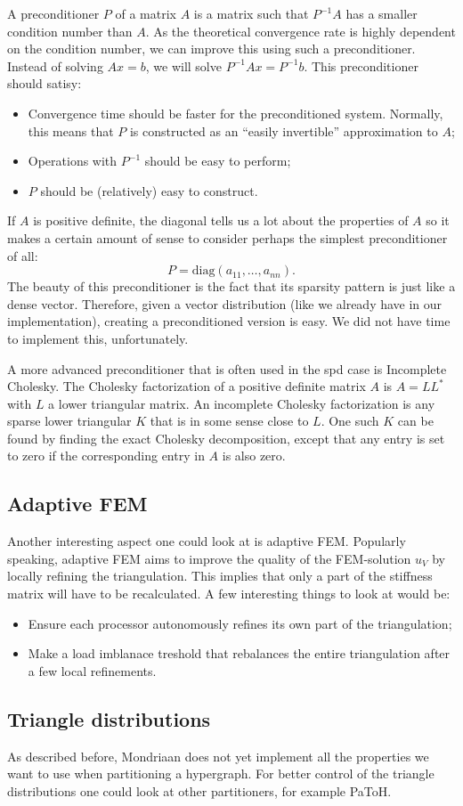 \documentclass[11pt]{amsart}
\theoremstyle{definition}
\begin{document}
A preconditioner $P$ of a matrix $A$ is a matrix such that $P^{-1}A$ has a smaller condition number than $A$. As the theoretical convergence rate is highly dependent on the condition number, we can improve this using such a preconditioner. Instead of solving $Ax = b$, we will solve $P^{-1}Ax = P^{-1}b$. This preconditioner should satisy:
\begin{itemize}
  \item Convergence time should be faster for the preconditioned system. Normally, this means that $P$ is constructed as an ``easily invertible'' approximation to $A$;
  \item Operations with $P^{-1}$ should be easy to perform;
  \item $P$ should be (relatively) easy to construct.
\end{itemize}

If $A$ is positive definite, the diagonal tells us a lot about the properties of $A$ so it makes a certain amount of sense to consider perhaps the simplest preconditioner of all:
\[
  P = \text{diag}(a_{11}, \ldots, a_{nn}).
\]
The beauty of this preconditioner is the fact that its sparsity pattern is just like a dense vector. Therefore, given a vector distribution (like we already have in our implementation), creating a preconditioned version is easy. We did not have time to implement this, unfortunately.

A more advanced preconditioner that is often used in the spd case is Incomplete Cholesky.  The Cholesky factorization of a positive definite matrix $A$ is $A = LL^*$ with $L$ a lower triangular matrix. An incomplete Cholesky factorization is any sparse lower triangular $K$ that is in some sense close to $L$. One such $K$ can be found by finding the exact Cholesky decomposition, except that any entry is set to zero if the corresponding entry in $A$ is also zero. \cite[\S11.5.8]{golub}
\subsection{Adaptive FEM}
Another interesting aspect one could look at is adaptive FEM.
Popularly speaking, adaptive FEM aims to improve the quality of the FEM-solution $u_V$ by locally refining the triangulation. This implies that only a part of the stiffness matrix will have to be recalculated. A few interesting things to look at would be:
\begin{itemize}
	\item Ensure each processor autonomously refines its own part of the triangulation;
	\item Make a load imblanace treshold that rebalances the entire triangulation after a few local refinements.
\end{itemize}
\subsection{Triangle distributions}
As described before, Mondriaan does not yet implement all the properties we want to use when partitioning a hypergraph. For better control of the triangle distributions one could look at other partitioners, for example PaToH. \cite{patoh}


\end{document}
